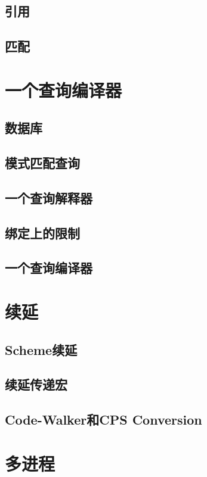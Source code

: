 \documentclass{ctexart}
\begin{document}
\subsection{引用}
\label{sec-18-3}
\subsection{匹配}
\label{sec-18-4}
\section{一个查询编译器}
\label{sec-19}
\subsection{数据库}
\label{sec-19-1}
\subsection{模式匹配查询}
\label{sec-19-2}
\subsection{一个查询解释器}
\label{sec-19-3}
\subsection{绑定上的限制}
\label{sec-19-4}
\subsection{一个查询编译器}
\label{sec-19-5}
\section{续延}
\label{sec-20}
\subsection{Scheme续延}
\label{sec-20-1}
\subsection{续延传递宏}
\label{sec-20-2}
\subsection{Code-Walker和CPS Conversion}
\label{sec-20-3}
\section{多进程}
\label{sec-21}
\end{document}
